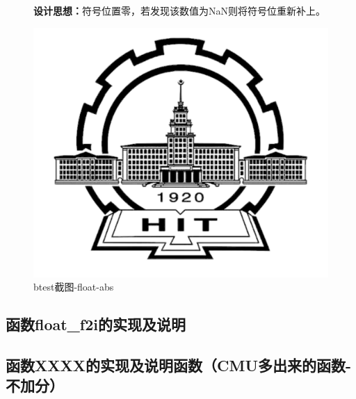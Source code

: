\begin{figure}[H]
\begin{minipage}[c]{0.5\linewidth}
\textbf{设计思想：}符号位置零，若发现该数值为NaN则将符号位重新补上。
\end{minipage}
\begin{minipage}[c]{0.4\linewidth}
\centering
\includegraphics[width=0.9\linewidth]{figures/HIT}
\caption{btest截图-float-abs}
\label{fig:float-abs}
\end{minipage}
\end{figure}

\subsection{函数float\_f2i的实现及说明}
\subsection{函数XXXX的实现及说明函数（CMU多出来的函数-不加分）}


